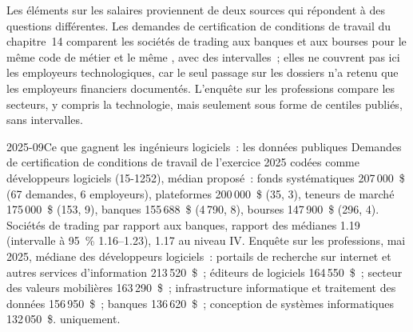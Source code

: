 Les éléments sur les salaires proviennent de deux sources qui répondent à des questions différentes. Les demandes de certification de conditions de travail du
chapitre~14 comparent les sociétés de trading aux banques et aux bourses pour le même code de métier et le même , avec des
intervalles~; elles ne couvrent pas ici les employeurs technologiques, car le seul passage sur les dossiers n'a retenu que les employeurs financiers
documentés. L'enquête sur les professions compare les secteurs, y compris la technologie, mais seulement sous forme de centiles publiés, sans
intervalles.

\begin{dated}{2025-09}{Ce que gagnent les ingénieurs logiciels~: les données publiques}\label{dat:in:software-engineer:pay}
Demandes de certification de conditions de travail de l'exercice 2025 codées comme développeurs logiciels (15-1252),  médian proposé~: fonds systématiques
207\,000~\$ (67 demandes, 6 employeurs), plateformes 200\,000~\$ (35, 3), teneurs de marché 175\,000~\$ (153, 9), banques
155\,688~\$ (4\,790, 8), bourses 147\,900~\$ (296, 4). Sociétés de trading par rapport aux banques, rapport des médianes 1.19 (intervalle à 95~\%
1.16--1.23), 1.17 au niveau IV. Enquête sur les professions, mai 2025, médiane des développeurs logiciels~: portails de recherche sur internet et autres
services d'information 213\,520~\$~; éditeurs de logiciels 164\,550~\$~; secteur des valeurs mobilières 163\,290~\$~; infrastructure informatique et traitement
des données 156\,950~\$~; banques 136\,620~\$~; conception de systèmes informatiques 132\,050~\$.  uniquement.
\end{dated}

